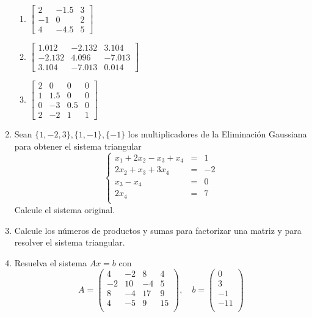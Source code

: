\documentclass[12pt,letterpaper]{article}
\theoremstyle{plain}
\begin{document}
\begin{enumerate}
\begin{multicols}{2}
\begin{enumerate}
\item $\left[ \begin{array}{ccc}
         2&-1.5&3\\
         -1&0&2\\
         4&-4.5&5
        \end{array}\right]
$

\item $\left[ \begin{array}{ccc}
         1.012&-2.132&3.104\\
         -2.132&4.096&-7.013\\
         3.104&-7.013&0.014
        \end{array}\right]
$

\item $\left[ \begin{array}{cccc}
         2&0&0&0\\
         1&1.5&0&0\\
         0&-3&0.5&0\\
         2&-2&1&1
        \end{array}\right]
$
\end{enumerate}
\end{multicols}

\item Sean $\{1,-2,3\},\{1,-1\},\{-1\}$ los multiplicadores de la Eliminaci\'on Gaussiana para obtener el sistema triangular
    $$
    \left\{\begin{array}{rrr}
    x_1+2x_2-x_3+x_4 & = & 1\\
    2x_2+x_3+ 3x_4 & = & -2\\
    x_3-x_4 & = & 0\\
    2x_4 &=&7\\
    \end{array}\right.
    $$
    Calcule el sistema original.

\item Calcule los n\'umeros de productos y sumas para factorizar una matriz y para resolver el sistema triangular.

\item Resuelva el sistema $Ax=b$ con
$$
A=\left( \begin{array}{cccc}
         4 & -2 & 8 & 4\\
        -2 & 10 & -4 & 5\\
         8 & -4 & 17 & 9\\
         4 & -5 & 9 & 15\\
        \end{array}\right), \quad
b=\left(\begin{array}{c}
0\\
3\\
-1\\
-11\\
\end{array}\right)
$$


\end{enumerate}
\end{document}
